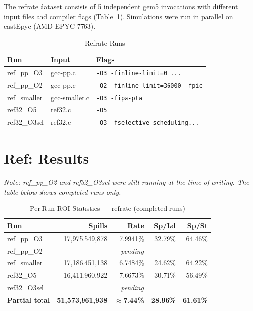 \documentclass[conference]{IEEEtran}
\begin{document}
The refrate dataset consists of 5 independent gem5 invocations with
different input files and compiler flags (Table~\ref{tab:ref_runs}).
Simulations were run in parallel on castEpyc (AMD EPYC 7763).

\begin{table}[H]
\centering
\caption{Refrate Runs}
\label{tab:ref_runs}
\begin{tabular}{lll}
\toprule
\textbf{Run} & \textbf{Input} & \textbf{Flags} \\
\midrule
ref\_pp\_O3    & gcc-pp.c    & \texttt{-O3 -finline-limit=0 ...} \\
ref\_pp\_O2    & gcc-pp.c    & \texttt{-O2 -finline-limit=36000 -fpic} \\
ref\_smaller   & gcc-smaller.c & \texttt{-O3 -fipa-pta} \\
ref32\_O5      & ref32.c     & \texttt{-O5} \\
ref32\_O3sel   & ref32.c     & \texttt{-O3 -fselective-scheduling...} \\
\bottomrule
\end{tabular}
\end{table}

\section{Ref: Results}

\textit{Note: ref\_pp\_O2 and ref32\_O3sel were still running at
the time of writing. The table below shows completed runs only.}

\begin{table}[H]
\centering
\caption{Per-Run ROI Statistics --- refrate (completed runs)}
\label{tab:ref_perrun}
\begin{tabular}{lrrrr}
\toprule
\textbf{Run} & \textbf{Spills} & \textbf{Rate}
    & \textbf{Sp/Ld} & \textbf{Sp/St} \\
\midrule
ref\_pp\_O3   & 17,975,549,878 & 7.9941\% & 32.79\% & 64.46\% \\
ref\_pp\_O2   & \multicolumn{4}{c}{\textit{pending}} \\
ref\_smaller  & 17,186,451,138 & 6.7484\% & 24.62\% & 64.22\% \\
ref32\_O5     & 16,411,960,922 & 7.6673\% & 30.71\% & 56.49\% \\
ref32\_O3sel  & \multicolumn{4}{c}{\textit{pending}} \\
\midrule
\textbf{Partial total} & \textbf{51,573,961,938}
    & $\approx$\textbf{7.44\%} & \textbf{28.96\%} & \textbf{61.61\%} \\
\bottomrule
\end{tabular}
\end{table}
\end{document}
